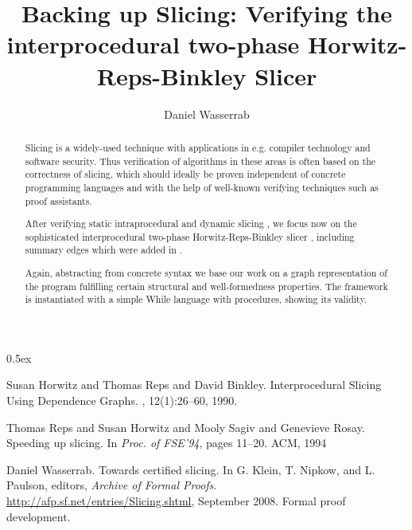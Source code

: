 \documentclass[11pt,a4paper,notitlepage]{report}
\begin{document}
\title{Backing up Slicing: Verifying the interprocedural two-phase Horwitz-Reps-Binkley Slicer}
\author{Daniel Wasserrab}
\maketitle

\begin{abstract}
Slicing is a widely-used technique with applications in e.g. compiler
technology and software security. Thus verification of
algorithms in these areas is often based on the correctness of slicing,
which should ideally be proven independent of concrete programming
languages and with the help of well-known verifying techniques such as
proof assistants. 

After verifying static intraprocedural and dynamic slicing \cite{Wasserrab:08}, we
focus now on the sophisticated interprocedural two-phase Horwitz-Reps-Binkley slicer
\cite{HorwitzRB:88}, including summary edges which were added in \cite{RepsHSR:94}.

Again, abstracting from concrete syntax we base our work on a graph
representation of the program fulfilling certain structural
and well-formedness properties. The framework is instantiated with a simple 
While language with procedures, showing its validity.
\end{abstract}

\parindent 0pt\parskip 0.5ex



%
%
\begin{thebibliography}{10}

Susan Horwitz and Thomas Reps and David Binkley.
\newblock Interprocedural Slicing Using Dependence Graphs.
, 12(1):26--60, 1990.

Thomas Reps and Susan Horwitz and Mooly Sagiv and Genevieve Rosay.
\newblock Speeding up slicing.
\newblock In {\em Proc. of FSE'94}, pages 11--20. ACM, 1994

\newblock Daniel Wasserrab.
\newblock Towards certified slicing.
\newblock In G. Klein, T. Nipkow, and L. Paulson, editors, {\em Archive of Formal
Proofs}.
\newblock \url{http://afp.sf.net/entries/Slicing.shtml}, September 2008.
\newblock Formal proof development.

\end{thebibliography}
\end{document}
